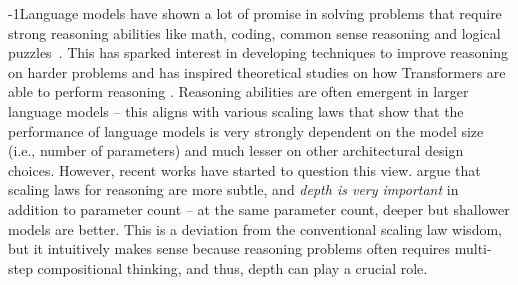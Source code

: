 \fi

\looseness-1Language models have shown a lot of promise in solving problems that require strong reasoning abilities like math, coding, common sense reasoning and logical puzzles~\citep{brown2020language, team2023gemini}.
This has sparked interest in developing techniques to improve reasoning on harder problems \citep{wei2022chain} and has inspired theoretical studies on how Transformers are able to perform reasoning \citep{feng2024towards,sanford2024understanding}.
Reasoning abilities are often emergent in larger language models \citep{wei2022emergent} -- this aligns with various scaling laws \citep{kaplan2020scaling,hoffmann2022training,allen2024physics} that show that the performance of language models is very strongly dependent on the model size (i.e., number of parameters) and much lesser on other architectural design choices.
However, recent works have started to question this view. \citet{ye2024physics} argue that scaling laws for reasoning are more subtle, and {\em depth is very important} in addition to parameter count -- at the same parameter count, deeper but shallower models are better.
This is a deviation from the conventional scaling law wisdom, but it intuitively makes sense because reasoning problems often requires multi-step compositional thinking, and thus, depth can play a crucial role.


